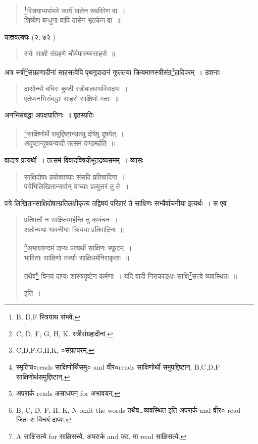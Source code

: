 \documentclass[11pt, openany]{book}
\begin{document}
\begin{quote}
{\vy \renewcommand{\thefootnote}{4}\footnote{ B, D,F स्त्रियाथ संभवे.}स्त्रियाप्यसंभवे कार्यं बालेन स्थविरेण वा~।\\
शिष्येण बन्धुना वापि दासेन भृतकेन वा~॥}
\end{quote}

याज्ञवल्क्यः (२. ७२ ) 

\begin{quote}
{\vy सर्वः साक्षी संग्रहणे चौर्यपारुष्यसाहसे~॥}
\end{quote}

अत्र स्त्री\renewcommand{\thefootnote}{5}\footnote{C, D, F, G, H, K. स्त्रीसंग्रहादीनां.}संग्रहणादीनां साहसत्वेपि पृथगुपादानं गुप्ततया क्रियमाणस्त्रीसंग्र\renewcommand{\thefootnote}{6}\footnote{C,D,F,G,H,K, ०संग्रहपरम्.}हादिपरम्~। उशनाः

\begin{quote}
{\vy दासोन्धो बधिरः कुष्ठी स्त्रीबालस्थविरादयः~।\\
एतेप्यनभिसंबद्धाः साहसे साक्षिणो मताः~॥}
\end{quote}

\newpage
{}

अनभिसंबद्धा अपक्षपातिनः~॥ बृहस्पतिः

\begin{quote}
{\vy \renewcommand{\thefootnote}{1}\footnote{स्मृतिच०reads साक्षिणोर्थिसमु० and वीर०reads साक्षिणोर्थी समुपद्दिष्टान्. B,C,D,F साक्षिणोर्थसमुद्दिष्टान्.}साक्षिणोर्थे समुद्दिष्टान्सत्सु दोषेषु दूषयेत्~।\\
अदुष्टान्दूषयन्वादी तत्समं दण्डमर्हति~॥}
\end{quote}

वाद्यत्र प्रत्यर्थी~। तत्समं विवादविषयीभूतद्रव्यसमम्~। व्यासः

\begin{quote}
{\vy साक्षिदोषाः प्रयोक्तव्याः संसदि प्रतिवादिना~।\\
पत्रेभिलिखितान्सर्वान् वाच्याः प्रत्युत्तरं तु ते~॥}
\end{quote}

पत्रे लिखितान्साक्षिदोषान्प्रतिलक्षीकृत्य तद्विषयं परिहारं ते साक्षिणः सभ्यैर्वाचनीया इत्यर्थः~। स एव

\begin{quote}
{\vy प्रतिपत्तौ न साक्षित्वमर्हन्ति तु कथंचन~।\\
अतोन्यथा भावनीयाः क्रियया प्रतिवादिना~॥

\renewcommand{\thefootnote}{2}\footnote{अपरार्क reads असाधयन् for अभावयन्.}अभावयन्दमं दाप्यः प्रत्यर्थी साक्षिणः स्फुटम्~।\\
भाविताः साक्षिणो वर्ज्याः साक्षिधर्मनिराकृताः~॥

तथैव\renewcommand{\thefootnote}{3}\footnote{B, C, D, F, H, K, N omit the words तथैव\ldots व्यवस्थित इति अपरार्क and वीर० read जितः स विनयं दाप्यः.} विनयं दाप्यः शास्त्रदृष्टेन कर्मणा~।
यदि वादी निराकाङ्क्षः साक्षि\renewcommand{\thefootnote}{4}\footnote{A साक्षिसत्ये for साक्षिसत्त्वे. अपरार्क and परा. मा read साक्षिसत्ये.}सत्त्वे व्यवस्थितः~॥} इति~।
\end{quote}
\end{document}
